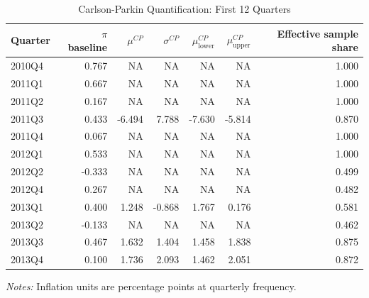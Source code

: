 \begin{table}[!htbp]
\centering
\small
\caption{Carlson-Parkin Quantification: First 12 Quarters}
\label{tab:cp_head}
\begin{threeparttable}

\begin{tabular}{lrrrrrr}
\toprule
Quarter & $\pi$ baseline & $\mu^{CP}$ & $\sigma^{CP}$ & $\mu^{CP}_{\text{lower}}$ & $\mu^{CP}_{\text{upper}}$ & Effective sample share \\
\midrule
2010Q4 & 0.767 & NA & NA & NA & NA & 1.000\\
2011Q1 & 0.667 & NA & NA & NA & NA & 1.000\\
2011Q2 & 0.167 & NA & NA & NA & NA & 1.000\\
2011Q3 & 0.433 & -6.494 & 7.788 & -7.630 & -5.814 & 0.870\\
2011Q4 & 0.067 & NA & NA & NA & NA & 1.000\\
\addlinespace
2012Q1 & 0.533 & NA & NA & NA & NA & 1.000\\
2012Q2 & -0.333 & NA & NA & NA & NA & 0.499\\
2012Q4 & 0.267 & NA & NA & NA & NA & 0.482\\
2013Q1 & 0.400 & 1.248 & -0.868 & 1.767 & 0.176 & 0.581\\
2013Q2 & -0.133 & NA & NA & NA & NA & 0.462\\
\addlinespace
2013Q3 & 0.467 & 1.632 & 1.404 & 1.458 & 1.838 & 0.875\\
2013Q4 & 0.100 & 1.736 & 2.093 & 1.462 & 2.051 & 0.872\\
\bottomrule
\end{tabular}
\begin{tablenotes}[flushleft]
\footnotesize
\item \textit{Notes:} Inflation units are percentage points at quarterly frequency.
\end{tablenotes}
\end{threeparttable}
\end{table}

